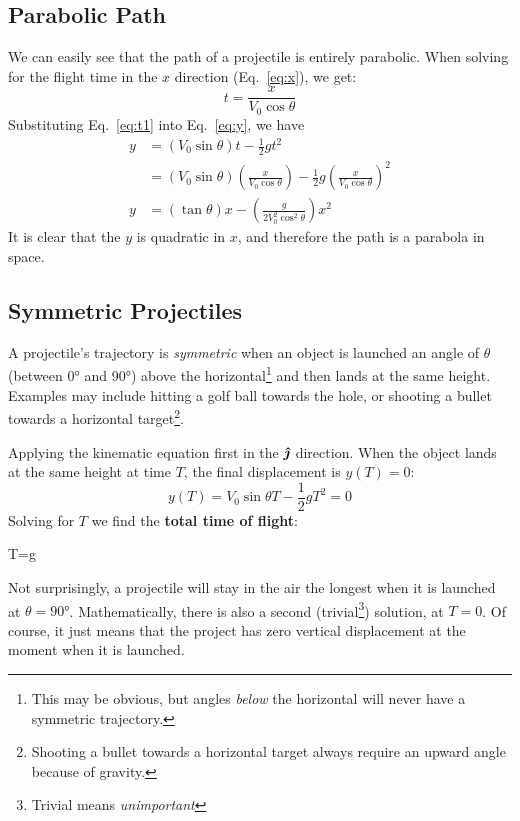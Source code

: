 \subsection{Parabolic Path}
We can easily see that the path of a projectile is entirely parabolic. When
solving for the flight time in the $x$ direction (Eq.~\ref{eq:x}), we get:
\begin{equation}
  t=\frac x{V_0\cos\theta}
  \label{eq:t1}
\end{equation}
Substituting Eq.~\ref{eq:t1} into Eq.~\ref{eq:y}, we have
\begin{align}
  y &=\left(V_0\sin\theta\right) t-\frac12gt^2\nonumber\\
  &= \left(V_0\sin\theta\right)\left(\frac x{V_0\cos\theta}\right)-\frac12g
  \left(\frac x{V_0\cos\theta}\right)^2\nonumber\\
  y&=\left(\tan\theta\right) x-\left(\frac g{2V_0^2\cos^2\theta}\right)x^2
\end{align}
It is clear that the $y$ is quadratic in $x$, and therefore the path is a
parabola in space.

\subsection{Symmetric Projectiles}
A projectile's trajectory is \emph{symmetric} when an object is launched an
angle of $\theta$ (between \ang{0} and \ang{90}) above the
horizontal\footnote{This may be obvious, but angles \emph{below} the
horizontal will never have a symmetric trajectory.} and then
lands at the same height. Examples may include hitting a golf ball towards the
hole, or shooting a bullet towards a horizontal target\footnote{Shooting a
bullet towards a horizontal target always require an upward angle because of
gravity.}.

Applying the kinematic equation first in the $\bm{\hat\jmath}$ direction. When the object
lands at the same height at time $T$, the final displacement is $y(T)=0$:
\begin{equation*}
  y(T)=V_0\sin\theta T-\frac12gT^2=0
\end{equation*}
Solving for $T$ we find the \textbf{total time of flight}:
\begin{important-equation}
  T=g
  \label{tmax}
\end{important-equation}
Not surprisingly, a projectile will stay in the air the longest when it is
launched at $\theta=\ang{90}$.
Mathematically, there is also a second (trivial\footnote{Trivial means
\emph{unimportant}}) solution, at $T=0$. Of course, it just means that the
project has zero vertical displacement at the moment when it is launched.

